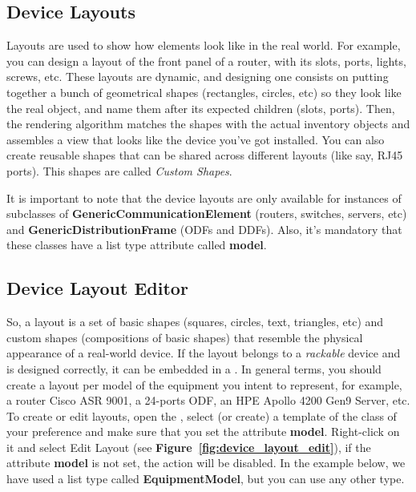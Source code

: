 \documentclass[a4paper]{article}
\begin{document}
	\subsection{Device Layouts} \label{sec:layouts}
	Layouts are used to show how elements look like in the real world. For example, you can design a layout of the front panel of a router, with its slots, ports, lights, screws, etc. These layouts are dynamic, and designing one consists on putting together a bunch of geometrical shapes (rectangles, circles, etc) so they look like the real object, and name them after its expected children (slots, ports). Then, the rendering algorithm matches the shapes with the actual inventory objects and assembles a view that looks like the device you've got installed. You can also create reusable shapes that can be shared across different layouts (like say, RJ45 ports). This shapes are called \textit{Custom Shapes}.
	
	It is important to note that the device layouts are only available for instances of subclasses of \textbf{GenericCommunicationElement} (routers, switches, servers, etc) and \textbf{GenericDistributionFrame} (ODFs and DDFs). Also, it's mandatory that these classes have a list type attribute called \textbf{model}.
	
	
	\subsection{Device Layout Editor} \label{sec:device_layout_editor}
	So, a layout is a set of basic shapes (squares, circles, text, triangles, etc) and custom shapes (compositions of basic shapes) that resemble the physical appearance of a real-world device. If the layout belongs to a \textit{rackable} device and is designed correctly, it can be embedded in a \textbf{}. In general terms, you should create a layout per model of the equipment you intent to represent, for example, a router Cisco ASR 9001, a 24-ports ODF, an HPE Apollo 4200 Gen9 Server, etc.
	\\
	To create or edit layouts, open the \textbf{}, select (or create) a template of the class of your preference and make sure that you set the attribute \textbf{model}. Right-click on it and select Edit Layout (see  \textbf{Figure~\ref{fig:device_layout_edit}}), if the attribute \textbf{model} is not set, the action will be disabled. In the example below, we have used a list type called \textbf{EquipmentModel}, but you can use any other type.
    
\end{document}
